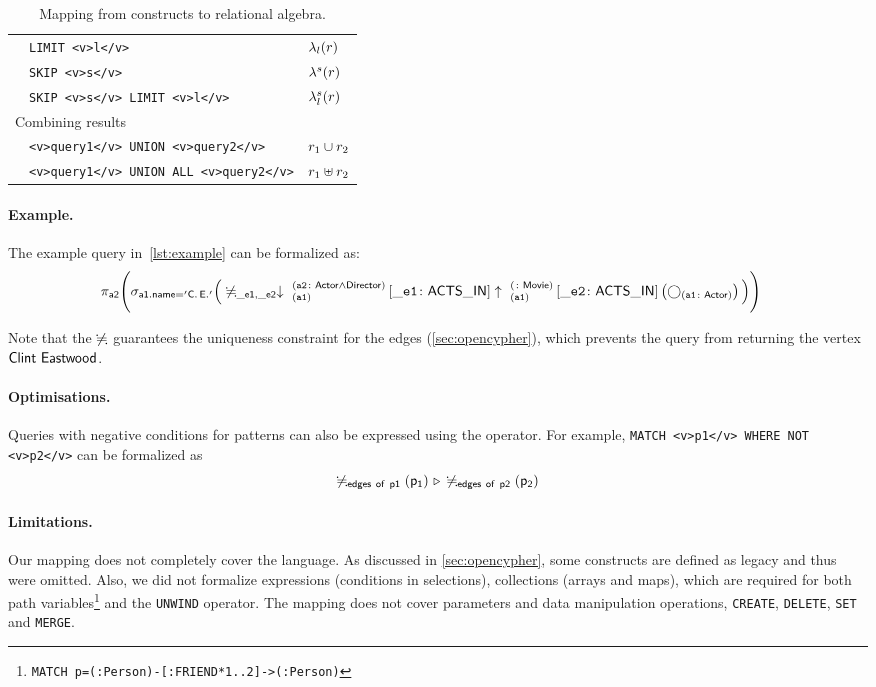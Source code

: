 \begin{table}[htbp]
\begin{tabular}{|l|l|l|}
		& \lstinline+LIMIT <v>l</v>+ & $\lambda_{l}(r)$ \\ \cline{2-3}

		& \lstinline+SKIP <v>s</v>+ & $\lambda^{s}(r)$ \\ \cline{2-3}
		
		& \lstinline+SKIP <v>s</v> LIMIT <v>l</v>+ & $\lambda_{l}^{s}(r)$ \\ \cline{2-3}
		
		\hline \multicolumn{3}{|l|}{Combining results } \\ \cline{2-3}
		
		& \lstinline+<v>query1</v> UNION <v>query2</v>+ & $r_1 \cup r_2$ \\ \cline{2-3}

		& \lstinline+<v>query1</v> UNION ALL <v>query2</v>+ & $r_1 \uplus r_2$ \\ \hline
	\end{tabular}
	\caption{Mapping from \opencypher constructs to relational algebra.}
	\label{table:mapping}
\end{table}

\paragraph{Example.} The example query in~\cref{lst:example} can be formalized as:
{\footnotesize
	\begin{align*}
	&\projection{a2} \Bigg(\selection{a1.name = 'C.\,E.'} \Big( \alldifferent{\_e1, \_e2} \expandin{a1}{a2}{Actor \land Director}{\_e1}{ACTS\_IN} \expandout{a1}{}{Movie}{\_e2}{ACTS\_IN} \left(\getvertices{a1}{Actor}\right) \Big) \Bigg)
	\end{align*}
}

Note that the $\not\fallingdotseq$ guarantees the uniqueness constraint for the edges (\cref{sec:opencypher}), which prevents the query from returning the vertex $\mathsf{Clint~Eastwood}$.

\paragraph{Optimisations.} Queries with negative conditions for patterns can also be expressed using the \antijointext operator. For example, \lstinline+MATCH <v>p1</v> WHERE NOT <v>p2</v>+ can be formalized as
$$\not\fallingdotseq_{\mathsf{\mathsf{edges~of~p1}}} \left(\mathsf{p_1}\right) \, \triangleright \, \not\fallingdotseq_{\mathsf{\mathsf{edges~of~p2}}} \left(\mathsf{p_2}\right)$$

\paragraph{Limitations.} Our mapping does not completely cover the \opencypher language. As discussed in \cref{sec:opencypher}, some constructs are defined as legacy and thus were omitted. Also, we did not formalize expressions (\eg  conditions in selections), collections (arrays and maps), which are required for both path variables\footnote{\lstinline+MATCH p=(:Person)-[:FRIEND*1..2]->(:Person)+} and the \lstinline+UNWIND+ operator. The mapping does not cover parameters and data manipulation operations, \eg \lstinline+CREATE+, \lstinline+DELETE+, \lstinline+SET+ and \lstinline+MERGE+.
